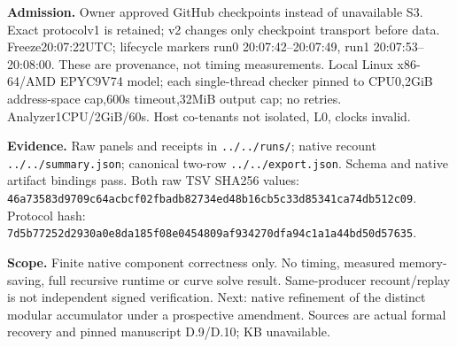 \documentclass[11pt]{article}
\begin{document}
\textbf{Admission.} Owner approved GitHub checkpoints instead of unavailable
S3. Exact protocolv1 is retained; v2 changes only checkpoint transport before
data. Freeze20:07:22UTC; lifecycle markers run0 20:07:42--20:07:49,
run1 20:07:53--20:08:00. These are provenance, not timing measurements.
Local Linux x86-64/AMD EPYC9V74 model; each single-thread checker pinned to
CPU0,2GiB address-space cap,600s timeout,32MiB output cap; no retries.
Analyzer1CPU/2GiB/60s. Host co-tenants not isolated, L0, clocks invalid.

\textbf{Evidence.} Raw panels and receipts in \texttt{../../runs/}; native
recount \texttt{../../summary.json}; canonical two-row \texttt{../../export.json}.
Schema and native artifact bindings pass. Both raw TSV SHA256 values:
\nolinkurl{46a73583d9709c64acbcf02fbadb82734ed48b16cb5c33d85341ca74db512c09}.
Protocol hash:
\nolinkurl{7d5b77252d2930a0e8da185f08e0454809af934270dfa94c1a1a44bd50d57635}.

\textbf{Scope.} Finite native component correctness only. No timing, measured
memory-saving, full recursive runtime or curve solve result. Same-producer
recount/replay is not independent signed verification. Next: native refinement
of the distinct modular accumulator under a prospective amendment.
Sources are actual formal recovery and pinned manuscript D.9/D.10; KB unavailable.
\end{document}
